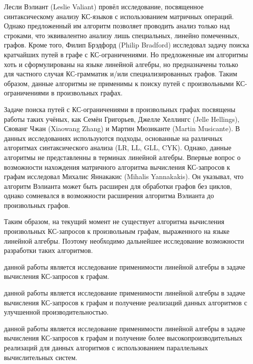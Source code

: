 Лесли Вэлиант (Leslie Valiant) провёл исследование, посвященное синтаксическому анализу КС-языков с использованием матричных операций. Однако предложенный им алгоритм позволяет проводить анализ только над строками, что эквивалентно анализу лишь специальных, линейно помеченных, графов. 
Кроме того, Филип Брэдфорд (Philip Bradford) исследовал задачу поиска кратчайших путей в графе с КС-ограничениями. Но предложенные им алгоритмы хоть и сформулированы на языке линейной алгебры, но предназначены только для частного случая КС-грамматик и/или специализированных графов. Таким образом, данные алгоритмы не применимы к поиску путей с произвольными КС-ограничениями в произвольных графах.

Задаче поиска путей с КС-ограничениями в произвольных графах посвящены работы таких учёных, как Семён Григорьев, Джелле Хеллингс (Jelle Hellings), Сяованг Чжан (Xiaowang Zhang) и Мартин Мюзиканте (Martin Musicante). В данных исследованиях используются подходы, основанные на различных алгоритмах синтаксического анализа (LR, LL, GLL, CYK). Однако, данные алгоритмы не представленны в терминах линейной алгебры. Впервые вопрос о возможности нахождения матричного алгоритма вычисления КС-запросов к графам исследовал Михалис Яннакакис (Mihalis Yannakakis). Он указывал, что алгоритм Вэлианта может быть расширен для обработки графов без циклов, однако сомневался в возможности расширения алгоритма Вэлианта до произвольных графов.

Таким образом, на текущий момент не существует алгоритма вычисления произвольных КС-запросов к произвольным графам, выраженного на языке линейной алгебры. Поэтому необходимо дальнейшее исследование возможности разработки таких алгоритмов.

{\aim} данной работы является исследование применимости линейной алгебры в задаче вычисления КС-запросов к графам.

{\aim} данной работы является исследование применимости линейной алгебры в задаче вычисления КС-запросов к графам и получение реализаций данных алгоритмов с улучшенной производительностью.

{\aim} данной работы является исследование применимости линейной алгебры в задаче вычисления КС-запросов к графам и получение более высокопроизводительных реализаций для данных алгоритмов с использованием параллельных вычислительных систем.

